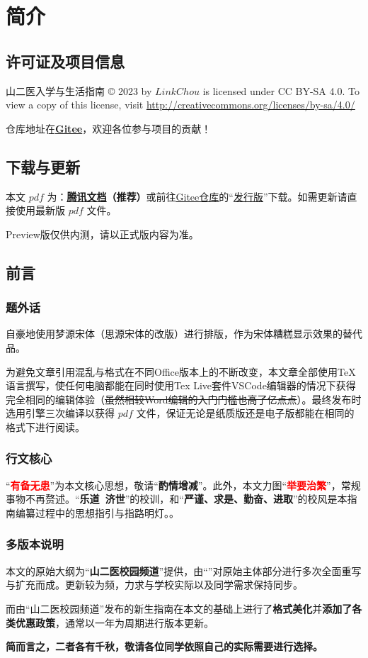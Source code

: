 \chapter[简介]{简介}

\section[许可证及项目信息]{许可证及项目信息}
山二医入学与生活指南 © 2023 by $LinkChou$ is licensed under CC BY-SA 4.0. To view a copy of this license, visit \uline{\href{http://creativecommons.org/licenses/by-sa/4.0/}{http://creativecommons.org/licenses/by-sa/4.0/}}

仓库地址在\textbf{\uline{\href{https://gitee.com/mikazo/guide_for_freshman}{Gitee}}}，欢迎各位参与项目的贡献！

\section[\textcolor{red}{下载与更新}]{下载与更新}
本文 $pdf$ \textbf{}为：\textbf{\uline{\textcolor{red}{\href{https://docs.qq.com/s/ETcQ-ZFSrSsh6MK9bm773q}{腾讯文档}}}（推荐）}或前往\uline{\href{https://gitee.com/mikazo/guide_for_freshman}{Gitee仓库}}的“\uline{\href{https://gitee.com/mikazo/latex_version/releases/latest}{发行版}}”下载。如需更新请直接使用最新版 $pdf$ 文件。

Preview版仅供内测，请以正式版内容为准。

\section[前言]{前言}
\subsection[题外话]{题外话}
自豪地使用梦源宋体（思源宋体的改版）进行排版，作为宋体糟糕显示效果的替代品。

为避免文章引用混乱与格式在不同Office版本上的不断改变，本文章全部使用\TeX 语言撰写，使任何电脑都能在同时使用Tex Live套件VSCode编辑器\footnotemark 的情况下获得完全相同的编辑体验（\sout{虽然相较Word编辑的入门门槛也高了亿点点}）。最终发布时选用\XeLaTeX 引擎三次编译以获得 $pdf$ 文件，保证无论是纸质版还是电子版都能在相同的格式下进行阅读。

\subsection[行文核心]{行文核心}
“\textcolor{red}{\textbf{有备无患}}”为本文核心思想，敬请“\textbf{酌情增减}”。此外，本文力图“\textcolor{red}{\textbf{举要治繁}}”，常规事物不再赘述。“\textbf{乐道\ 济世}”的校训，和“\textbf{严谨、求是、勤奋、进取}”的校风是本指南编纂过程中的思想指引与指路明灯。\textbf{\uuline{\textcolor{red}{浮烟山校区是本文叙述的重点，如无特别说明均指浮烟山校区}}}。

\subsection[多版本说明]{多版本说明}
本文的原始大纲为“\textbf{山二医校园频道}”提供，由“\textbf{}”对原始主体部分进行多次全面重写与扩充而成。更新较为频，力求与学校实际以及同学需求保持同步。

而由“山二医校园频道”发布的新生指南在本文的基础上进行了\textbf{格式美化}并\textbf{添加了各类优惠政策}，通常以一年为周期进行版本更新。

\textbf{简而言之，二者各有千秋，敬请各位同学依照自己的实际需要进行选择。}
